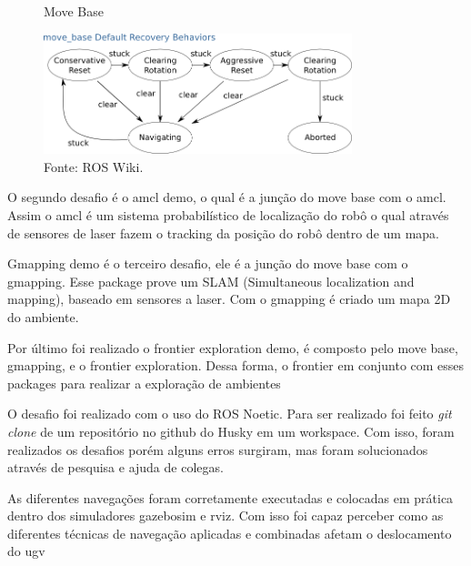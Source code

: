 
\begin{figure} [h!]
    \centering
    \caption{Move Base}
    \includegraphics[width=0.8\textwidth]{Figures/recovery_behaviors.png}
    \caption*{Fonte: ROS Wiki.}
    \label{fig:Move Base}
\end{figure}

O segundo desafio é o amcl demo, o qual é a junção do move base com o amcl. Assim o amcl é um sistema probabilístico de localização do robô o qual através de sensores de laser fazem o tracking da posição do robô dentro de um mapa.



Gmapping demo é o terceiro desafio, ele é a junção do move base com o gmapping. Esse package prove um SLAM (Simultaneous localization and mapping), baseado em sensores a laser. Com o gmapping é criado um mapa 2D do ambiente.



Por último foi realizado o frontier exploration demo, é composto pelo move base, gmapping, e o frontier exploration. Dessa forma, o frontier em conjunto com esses packages para realizar a exploração de ambientes


O desafio foi realizado com o uso do ROS Noetic. Para ser realizado foi feito \textit{git clone} de um repositório no github do Husky em um workspace. Com isso, foram realizados os desafios porém alguns erros surgiram, mas foram solucionados através de pesquisa e ajuda de colegas.


As diferentes navegações foram corretamente executadas e colocadas em prática dentro dos simuladores gazebosim e rviz. Com isso foi capaz perceber como as diferentes técnicas de navegação aplicadas e combinadas afetam o deslocamento do ugv